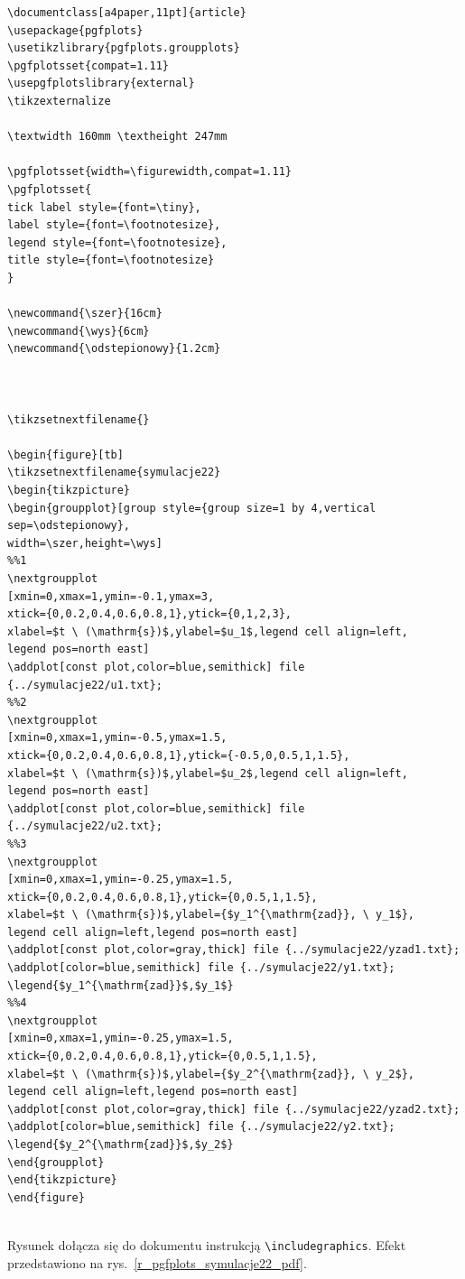 \begin{lstlisting}[style=customlatex,frame=single]
\documentclass[a4paper,11pt]{article}
\usepackage{pgfplots}
\usetikzlibrary{pgfplots.groupplots}
\pgfplotsset{compat=1.11}
\usepgfplotslibrary{external}
\tikzexternalize

\textwidth 160mm \textheight 247mm

\pgfplotsset{width=\figurewidth,compat=1.11}
\pgfplotsset{
tick label style={font=\tiny},
label style={font=\footnotesize},
legend style={font=\footnotesize},
title style={font=\footnotesize}
}

\newcommand{\szer}{16cm}
\newcommand{\wys}{6cm}
\newcommand{\odstepionowy}{1.2cm}



\tikzsetnextfilename{}

\begin{figure}[tb]
\tikzsetnextfilename{symulacje22}
\begin{tikzpicture}
\begin{groupplot}[group style={group size=1 by 4,vertical sep=\odstepionowy},
width=\szer,height=\wys]
%%1
\nextgroupplot
[xmin=0,xmax=1,ymin=-0.1,ymax=3,
xtick={0,0.2,0.4,0.6,0.8,1},ytick={0,1,2,3},
xlabel=$t \ (\mathrm{s})$,ylabel=$u_1$,legend cell align=left,
legend pos=north east]
\addplot[const plot,color=blue,semithick] file {../symulacje22/u1.txt};
%%2
\nextgroupplot
[xmin=0,xmax=1,ymin=-0.5,ymax=1.5,
xtick={0,0.2,0.4,0.6,0.8,1},ytick={-0.5,0,0.5,1,1.5},
xlabel=$t \ (\mathrm{s})$,ylabel=$u_2$,legend cell align=left,
legend pos=north east]
\addplot[const plot,color=blue,semithick] file {../symulacje22/u2.txt};
%%3
\nextgroupplot
[xmin=0,xmax=1,ymin=-0.25,ymax=1.5,
xtick={0,0.2,0.4,0.6,0.8,1},ytick={0,0.5,1,1.5},
xlabel=$t \ (\mathrm{s})$,ylabel={$y_1^{\mathrm{zad}}, \ y_1$},
legend cell align=left,legend pos=north east]
\addplot[const plot,color=gray,thick] file {../symulacje22/yzad1.txt};
\addplot[color=blue,semithick] file {../symulacje22/y1.txt};
\legend{$y_1^{\mathrm{zad}}$,$y_1$}
%%4
\nextgroupplot
[xmin=0,xmax=1,ymin=-0.25,ymax=1.5,
xtick={0,0.2,0.4,0.6,0.8,1},ytick={0,0.5,1,1.5},
xlabel=$t \ (\mathrm{s})$,ylabel={$y_2^{\mathrm{zad}}, \ y_2$},
legend cell align=left,legend pos=north east]
\addplot[const plot,color=gray,thick] file {../symulacje22/yzad2.txt};
\addplot[color=blue,semithick] file {../symulacje22/y2.txt};
\legend{$y_2^{\mathrm{zad}}$,$y_2$}
\end{groupplot}
\end{tikzpicture}
\end{figure}


\end{lstlisting}
Rysunek dołącza się do dokumentu instrukcją \verb+\includegraphics+. Efekt przedstawiono na rys.~\ref{r_pgfplots_symulacje22_pdf}.

